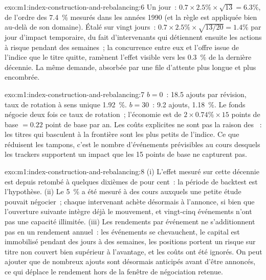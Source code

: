 \begin{solution}{exo:m1:index-construction-and-rebalancing:6}
Un jour~: $0.7 \times 2.5\% \times \sqrt{13} = 6.3\%$, de l'ordre des 7.4~\%
mesurés dans les années 1990 (et la règle est appliquée bien au-delà de son domaine).
Étalé sur vingt jours~: $0.7 \times 2.5\% \times \sqrt{13/20} = 1.4\%$ par jour
d'impact temporaire, du fait d'intervenants qui détiennent ensuite les actions à risque pendant
des semaines~; la concurrence entre eux et l'offre issue de l'indice que le titre
quitte, ramènent l'effet visible vers les 0.3~\% de la dernière décennie.
La même demande, absorbée par une file d'attente plus longue et plus encombrée.
\end{solution}

\begin{solution}{exo:m1:index-construction-and-rebalancing:7}
$b = 0$~: 18.5 ajouts par révision, taux de rotation à sens unique 1.92~\%. $b = 30$~: 9.2
ajouts, 1.18~\%. Le fonds négocie deux fois ce taux de rotation~; l'économie est
de $2 \times 0.74\% \times 15$ points de base $= 0.22$ point de base par an.
Les coûts explicites ne sont pas la raison des ~: les titres qui basculent à
la frontière sont les plus petits de l'indice. Ce que réduisent les tampons, c'est le nombre
d'événements prévisibles au cours desquels les trackers supportent un impact que les 15 points de base ne
capturent pas.
\end{solution}

\begin{solution}{exo:m1:index-construction-and-rebalancing:8}
(i) L'effet mesuré sur cette décennie est depuis retombé à quelques dixièmes de
pour cent~: la période de backtest est l'hypothèse. (ii) Le 5~\% a été mesuré
à des cours auxquels une petite étude pouvait négocier~; chaque intervenant achète désormais
à l'annonce, si bien que l'ouverture suivante intègre déjà le mouvement, et
vingt-cinq événements n'ont pas une capacité illimitée. (iii) Les rendements par événement
ne s'additionnent pas en un rendement annuel~: les événements se chevauchent, le capital est immobilisé pendant des jours à
des semaines, les positions portent un risque sur titre non couvert bien supérieur à l'avantage, et
les coûts ont été ignorés. On peut ajouter que de nombreux ajouts sont désormais anticipés
avant d'être annoncés, ce qui déplace le rendement hors de la fenêtre
de négociation retenue.
\end{solution}

